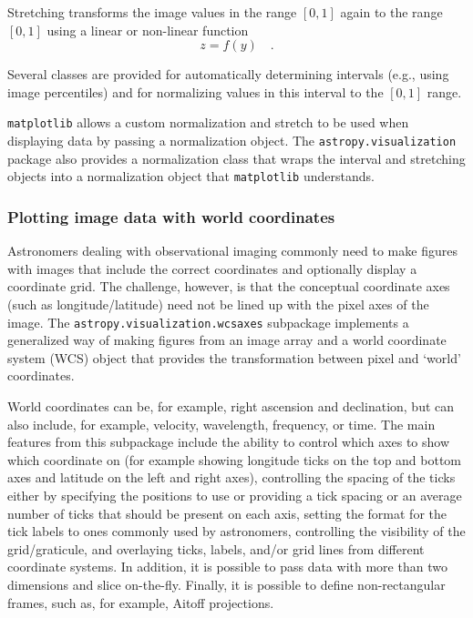\documentclass[modern]{aastex61}
\newcommand{\package}[1]{\texttt{#1}\xspace}
\begin{document}
Stretching transforms the image values in the range $[0,1]$ again to the range $[0,1]$ using a linear or non-linear function
\begin{equation}
z = f(y) \quad .
\end{equation}

Several classes are provided for automatically determining intervals (e.g., using image percentiles) and for normalizing values in this interval to the $[0,1]$ range.

\package{matplotlib} allows a custom normalization and stretch to be used when displaying data by passing a normalization object. The \package{astropy.visualization} package also provides a normalization class that wraps the interval and stretching objects into a normalization object that \package{matplotlib} understands.

\subsubsection{Plotting image data with world coordinates}

Astronomers dealing with observational imaging commonly need to make figures with images that include the correct coordinates and optionally display a coordinate grid. The challenge, however, is that the conceptual coordinate axes (such as longitude/latitude) need not be lined up with the pixel axes of the image. The \package{astropy.visualization.wcsaxes} subpackage implements a generalized way of making figures from an image array and a world coordinate system (WCS) object that provides the transformation between pixel and `world' coordinates.

World coordinates can be, for example, right ascension and declination, but can also include, for example, velocity, wavelength, frequency, or time. The main features from this subpackage include the ability to control which axes to show which coordinate on (for example showing longitude ticks on the top and bottom axes and latitude on the left and right axes), controlling the spacing of the ticks either by specifying the positions to use or providing a tick spacing or an average number of ticks that should be present on each axis, setting the format for the tick labels to ones commonly used by astronomers, controlling the visibility of the grid/graticule, and overlaying ticks, labels, and/or grid lines from different coordinate systems. In addition, it is possible to pass data with more than two dimensions and slice on-the-fly. Finally, it is possible to define non-rectangular frames, such as, for example, Aitoff projections.
\end{document}
